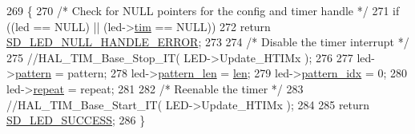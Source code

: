 \begin{DoxyCode}
269 \{
270     \textcolor{comment}{/* Check for NULL pointers for the config and timer handle */}
271     \textcolor{keywordflow}{if} ((led == NULL) || (led->\mbox{\hyperlink{structsd__led_a6e46bfc6fae939f8fc5ee53ea4551f18}{tim}} == NULL)) 
272         \textcolor{keywordflow}{return} \mbox{\hyperlink{group___s_d___l_e_d___types_gga4f347a1003b4089de88a7f0fc62c1071ac90640745bacb0ff9863a4d917ae02a1}{SD\_LED\_NULL\_HANDLE\_ERROR}};
273   
274     \textcolor{comment}{/* Disable the timer interrupt */}
275     \textcolor{comment}{//HAL\_TIM\_Base\_Stop\_IT( LED->Update\_HTIMx );}
276   
277     led->\mbox{\hyperlink{structsd__led_a70c2ff7a80dc607b1f146e4aa1494c43}{pattern}} = pattern;
278     led->\mbox{\hyperlink{structsd__led_ad68a2de2731d9bf342369de2cdc270c5}{pattern\_len}} = \mbox{\hyperlink{structsd__cbuf_a96bbf959016e4411c9e6b9812a8be60a}{len}};
279     led->\mbox{\hyperlink{structsd__led_a60a9dc074fe55a93fc9752d68bef8673}{pattern\_idx}} = 0;
280     led->\mbox{\hyperlink{structsd__led_a29642221aad4146341708fe32dfb8064}{repeat}} = repeat;
281   
282     \textcolor{comment}{/* Reenable the timer */}
283     \textcolor{comment}{//HAL\_TIM\_Base\_Start\_IT( LED->Update\_HTIMx );}
284  
285     \textcolor{keywordflow}{return} \mbox{\hyperlink{group___s_d___l_e_d___types_gga4f347a1003b4089de88a7f0fc62c1071ad3d9e41d4cdb2e47e8754d0a1a3824e2}{SD\_LED\_SUCCESS}};
286 \}
\end{DoxyCode}
